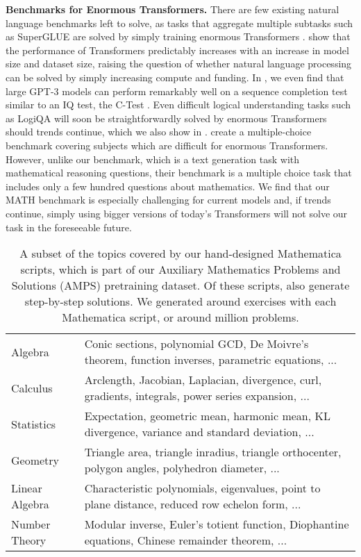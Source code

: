 \documentclass{article}
\begin{document}
\textbf{Benchmarks for Enormous Transformers.}\quad
There are few existing natural language benchmarks left to solve, as tasks that aggregate multiple subtasks such as SuperGLUE \citep{Wang2019SuperGLUEAS} are solved by simply training enormous Transformers \citep{He2020DeBERTaDB}.
\citet{Kaplan2020ScalingLF, Henighan2020ScalingLF} show that the performance of Transformers predictably increases with an increase in model size and dataset size, raising the question of whether natural language processing can be solved by simply increasing compute and funding. In , we even find that large GPT-3 models can perform remarkably well on a sequence completion test similar to an IQ test, the C-Test \citep{ctest,Legg2007UniversalIA}. Even difficult logical understanding tasks such as LogiQA \citep{Liu2020LogiQAAC} will soon be straightforwardly solved by enormous Transformers should trends continue, which we also show in . 
\citet{Hendrycks2020MeasuringMM} create a multiple-choice benchmark covering  subjects which are difficult for enormous Transformers. However, unlike our benchmark, which is a text generation task with  mathematical reasoning questions, their benchmark is a multiple choice task that includes only a few hundred questions about mathematics. 
We find that our MATH benchmark is especially challenging for current models and, if trends continue, simply using bigger versions of today's Transformers will not solve our task in the foreseeable future.




 \begin{table*}[ht]
	\vspace{-15pt}
	\centering
	\setlength\tabcolsep{10pt}
	\begin{tabular}{l|l}
        Algebra         & Conic sections, polynomial GCD, De Moivre's theorem, function inverses, parametric equations, ... \\
        Calculus        & Arclength, Jacobian, Laplacian, divergence, curl, gradients, integrals, power series expansion, ... \\
        Statistics      & Expectation, geometric mean, harmonic mean, KL divergence, variance and standard deviation, ... \\
        Geometry        & Triangle area, triangle inradius, triangle orthocenter, polygon angles, polyhedron diameter, ...\\
        Linear Algebra      & Characteristic polynomials, eigenvalues, point to plane distance, reduced row echelon form, ... \\
        Number Theory       & Modular inverse, Euler's totient function, Diophantine equations, Chinese remainder theorem, ... \\
    \end{tabular}
	\caption{A subset of the topics covered by our  hand-designed Mathematica scripts, which is part of our Auxiliary Mathematics Problems and Solutions (AMPS) pretraining dataset. Of these scripts,  also generate step-by-step solutions. We generated around  exercises with each Mathematica script, or around  million problems.}\label{fig:mesa}
	\vspace{-5pt}
\end{table*}
\end{document}
